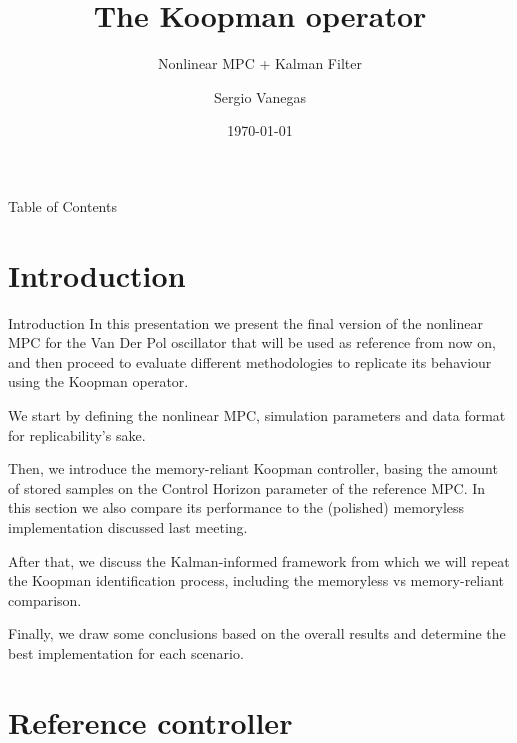 \documentclass{beamer}
\title[Process]{The Koopman operator}
\subtitle{Nonlinear MPC + Kalman Filter}
\institute[Polimi]{Politecnico di Milano}
\author{Sergio Vanegas}
\date{\today}
\begin{document}
\begin{frame}
    \maketitle
\end{frame}

\begin{frame}{Table of Contents}
    \tableofcontents
\end{frame}


\section{Introduction}

\begin{frame}{Introduction}
    In this presentation we present the final version of the nonlinear MPC for the Van Der Pol oscillator that will be used as reference from now on, and then proceed to evaluate different methodologies to replicate its behaviour using the Koopman operator.

    We start by defining the nonlinear MPC, simulation parameters and data format for replicability's sake.

    Then, we introduce the memory-reliant Koopman controller, basing the amount of stored samples on the Control Horizon parameter of the reference MPC. In this section we also compare its performance to the (polished) memoryless implementation discussed last meeting.

    After that, we discuss the Kalman-informed framework from which we will repeat the Koopman identification process, including the memoryless vs memory-reliant comparison.

    Finally, we draw some conclusions based on the overall results and determine the best implementation for each scenario.
\end{frame}


\section{Reference controller}
\end{document}
